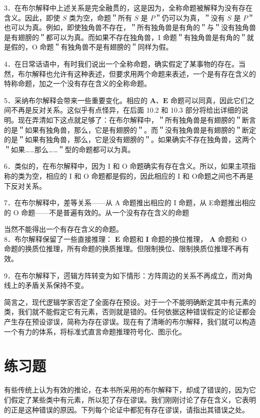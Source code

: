 3．在布尔解释中上述关系是完全融贯的，这是因为，全称命题被解释为没有存在含义。因此，即使 $S$ 类为空，命题＂所有 $S$ 是 $P$＂仍可以为真，＂没有 $S$ 是 $P$＂也可以为真。例如，即使独角兽不存在，＂所有独角兽是有角的＂与＂没有独角兽是有翅膀的＂都可以为真。而如果不存在独角兽，I 命题＂有独角兽是有角的＂就是假的，O 命题＂有独角兽不是有翅膀的＂同样为假。

4．在日常话语中，有时我们说出一个全称命题，确实假定了某事物的存在。当然，布尔解释也允许有这种表述，但要求用两个命题来表述，一个是有存在含义的特称命题，加之一个没有存在含义的全称命题。

5．采纳布尔解释会带来一些重要变化。相应的 $\mathbf{A 、 E}$ 命题可以同真，因此它们之间不再是反对关系。这似乎有点怪异，在后面 10.2 和 10.3 部分将给出详细的说明。现在弄清如下这点就足够了：在布尔解释中，＂所有独角兽是有翅膀的＂断言的是＂如果有独角兽，那么，它是有翅膀的＂。而＂没有独角兽是有翅膀的＂断定的是＂如果有独角兽，那么，它是没有翅膀的＂。如果确实不存在独角兽，这两个＂如果……那么……＂型的命题都可以为真。

6．类似的，在布尔解释中，因为 I 和 O 命题确实有存在含义。所以，如果主项指称的类为空，相应的 I 和 O 命题都是假的，因此相应的 I 和 O命题之间也不再是下反对关系。

7．在布尔解释中，差等关系——从 A 命题推出相应的 I 命题，从 E命题推出相应的 O 命题——不是普遍有效的。从一个没有存在含义的命题

当然不能得出一个有存在含义的命题。\\
8．布尔解释保留了一些直接推理： $\mathbf{E}$ 命题和 $\mathbf{I}$ 命题的换位推理， $\mathbf{A}$ 命题和 O 命题的换质位推理，所有命题的换质推理。但限制换位、限制换质位推理不再有效。

9．在布尔解释下，遌辑方阵转变为如下情形：方阵周边的关系不再成立，而对角线上的矛盾关系保持不变。

简言之，现代逻辑学家否定了全面存在预设。对于一个不能明确断定其中有元素的类，我们就不能假定它有元素，否则就是错的。任何依据这种错误假定的论证都会产生存在预设谬误，简称为存在谬误。现在有了清晰的布尔解释，我们就可以构造一个有力的体系，将标准式直言命题推理符号化、图示化。

\section*{练习题}
有些传统上认为有效的推论，在本书所采用的布尔解释下，却成了错误的，因为它们假定了某些类中有元素，所以犯了存在谬误。我们刚刚讨论了存在含义，它表明的正是这种错误的原因。下列每个论证中都犯有存在谬误，请指出其错误之处。

